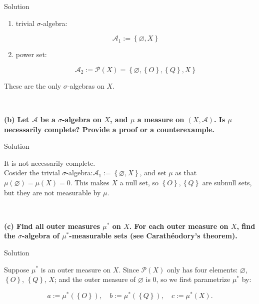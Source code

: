 \documentclass{qlnotes-export}
\begin{document}
\begin{qlsolution}{Solution}

\begin{enumerate}
\item
  trivial \(\sigma\)-algebra:

  \[\mathcal{A}_{1} := \left\{ {\varnothing, X} \right\}\]
\item
  power set:

  \[\mathcal{A}_{2} := \mathcal{P}(X) = \left\{ {\varnothing,\left\{ O \right\},\left\{ Q \right\}, X} \right\}\]
\end{enumerate}

These are the only \(\sigma\)-algebras on \(X\).\\
\strut \\

\end{qlsolution}

\textbf{(b) Let \(\mathcal{A}\) be a \(\sigma\)-algebra on \(X\), and \(\mu\) a measure on \((X,\mathcal{A})\). Is \(\mu\) necessarily complete? Provide a proof or a counterexample.}

\begin{qlsolution}{Solution}

It is not necessarily complete.\\
Cosider the trivial \(\sigma\)-algebra:\(\mathcal{A}_{1} := \left\{ {\varnothing, X} \right\}\), and set \(\mu\) as that \(\mu(\varnothing) = \mu(X) = 0\). This makes \(X\) a null set, so \(\left\{ O \right\},\left\{ Q \right\}\) are subnull sets, but they are not measurable by \(\mu\).\\
\strut \\

\end{qlsolution}

\textbf{(c) Find all outer measures \(\mu^{\ast}\) on \(X\). For each outer measure on \(X\), find the \(\sigma\)-algebra of \(\mu^{\ast}\)-measurable sets (see Carathéodory's theorem).}

\begin{qlsolution}{Solution}

Suppose \(\mu^{\ast}\) is an outer measure on \(X\). Since \(\mathcal{P}(X)\) only has four elements: \(\varnothing\), \(\left\{ O \right\}\), \(\left\{ Q \right\}\), \(X\); and the outer measure of \(\varnothing\) is 0, so we first parametrize \(\mu^{\ast}\) by:

\[a := \mu^{\ast}(\left\{ O \right\}),\quad b := \mu^{\ast}(\left\{ Q \right\}),\quad c := \mu^{\ast}(X).\]

\end{qlsolution}
\end{document}
